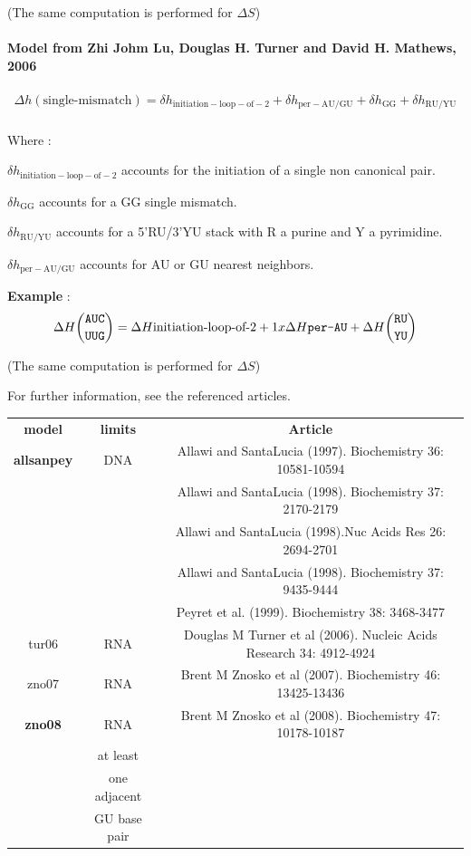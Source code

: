 \documentclass{article}
\begin{document}
       (The same computation is performed for $\Delta S$)
       

\paragraph{\textbf{Model from Zhi Johm Lu, Douglas H. Turner and David H. Mathews, 2006}}

\begin{multline*}
\Delta h {(\mbox{single-mismatch})} =
\delta{}h_\mathrm{initiation-loop-of-2} +
\delta{}h_\mathrm{per-AU/GU} +
\delta{}h_\mathrm{GG} +
\delta{}h_\mathrm{RU/YU}\\
\end{multline*}

Where :

$\delta{}h_\mathrm{initiation-loop-of-2}$ accounts for the initiation of a single non canonical pair.

$\delta{}h_\mathrm{GG}$ accounts for a GG single mismatch.

$\delta{}h_\mathrm{RU/YU}$ accounts for a 5'RU/3'YU stack with R a purine and Y a pyrimidine.

$\delta{}h_\mathrm{per-AU/GU}$ accounts for AU or GU nearest neighbors.

\textbf{Example} :
\begin{multline*}
\Delta H {\mbox{\texttt{AUC}} \choose \mbox{\texttt{UUG}}} =
\Delta H {\mbox{initiation-loop-of-2}} + 
1 x \Delta H {\mbox{\texttt{per-AU}} } +
\Delta H {\mbox{\texttt{RU}} \choose \mbox{\texttt{YU}} } \\
\end{multline*}

       (The same computation is performed for $\Delta S$)
       
For further information, see the referenced articles.

\begin{table}[h]
\begin{tabular}[h]{| c | c | c |}
\textbf{model} & \textbf{limits} & \textbf{Article} \\
\textbf{allsanpey} & DNA & Allawi and SantaLucia (1997). Biochemistry 36: 10581-10594 \\
 & & Allawi and SantaLucia (1998). Biochemistry 37: 2170-2179 \\
 & & Allawi and SantaLucia (1998).Nuc Acids Res 26: 2694-2701 \\
 & & Allawi and SantaLucia (1998). Biochemistry 37: 9435-9444 \\
 & & Peyret et al. (1999). Biochemistry 38: 3468-3477 \\ 
tur06 & RNA & Douglas M Turner et al (2006). Nucleic Acids Research 34: 4912-4924 \\
zno07 & RNA & Brent M Znosko et al (2007). Biochemistry 46: 13425-13436 \\
\textbf{zno08} & RNA & Brent M Znosko et al (2008). Biochemistry 47: 10178-10187 \\
 & at least & \\
 & one adjacent & \\
 & GU base pair & \\
\end{tabular}
\end{table}
\end{document}
